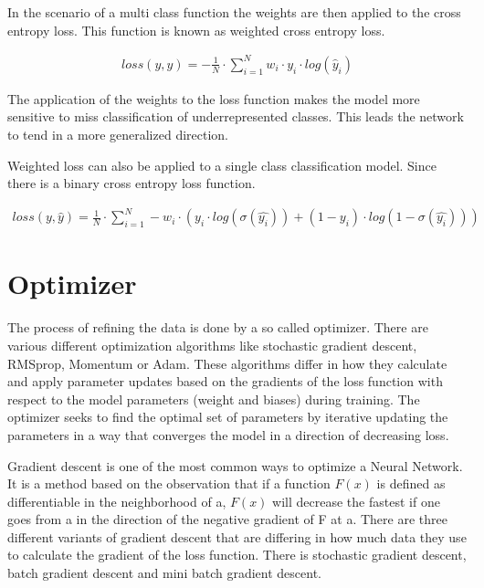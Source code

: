 \documentclass[
a4paper, 
12pt,
grayscalebody, %
abstract=on,
twoside, BCOR10mm, 12pt, DIV13,headinclude, footexclude, final, abstracton, openright
]{ibireprt}
\numberwithin{equation}{chapter}
\numberwithin{table}{chapter}
\numberwithin{figure}{chapter}
\numberwithin{algorithm}{chapter}
\numberwithin{example}{chapter}
\numberwithin{example}{chapter}
\begin{document}
In the scenario of a multi class function the weights are then applied to the cross entropy loss. This function is known as weighted cross entropy loss. 

\begin{align}
	loss(y,\hat{y})= -	\frac{1}{N}\cdot \sum_{i=1}^{N} w_i \cdot y_i \cdot log(\hat{y}_i)
\end{align}

The application of the weights to the loss function makes the model more sensitive to miss classification of underrepresented classes. This leads the network to tend in a more generalized direction.

Weighted loss can also be applied to a single class classification model. Since there is a binary cross entropy loss function.

\begin{align}
	loss(y,\hat{y})=\frac{1}{N}\cdot\sum_{i=1}^{N} -w_i \cdot (y_i \cdot log(\sigma(\hat{y_i}))+(1-y_i)\cdot log(1-\sigma(\hat{y_i})) )
\end{align}


\section{Optimizer}
The process of refining the data is done by a so called optimizer. There are various different optimization algorithms like stochastic gradient descent, RMSprop, Momentum or Adam. These algorithms differ in how they calculate and apply parameter updates based on the gradients of the loss function with respect to the model parameters (weight and biases) during training. The optimizer  seeks to find the optimal set of parameters by iterative updating the parameters in a way that converges the model in a direction of decreasing loss.

Gradient descent is one of the most common ways to optimize a Neural Network.\cite{Ruder2016} It is a method based on the observation that if a function $F(x)$ is defined as differentiable in the neighborhood of a, $F(x)$ will decrease the fastest if one goes from a in the direction of the negative gradient of F at a. There are three different variants of gradient descent that are differing in how much data they use to calculate the gradient of the loss function. There is stochastic gradient descent, batch gradient descent and mini batch gradient descent. 
\end{document}
